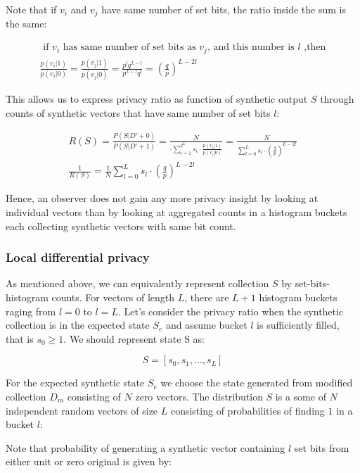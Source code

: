 \documentclass[11pt,draft]{article}
\begin{document}
Note that if $v_i$ and $v_j$ have same number of set bits, the ratio inside the sum is the same:

\begin{align}
\text { if } v_i \text { has same number of set bits as } v_j \text{, and this number is  } l \text{ ,then}  \\
\frac{p(v_i|1)}{p(v_i|0)}  = \frac{p(v_j|1)}{p(v_j|0)} = \frac{p^lq^{L-l}}{p^{L-l}q^l } = \left ( \frac{q}{p} \right )^ {L - 2l}
\end{align}

This allows us to express privacy ratio as function of synthetic output $S$ through counts of synthetic vectors that have same number of set bits $l$:

\begin{align}
R(S) = \frac{P(S|D'+0)}{P(S|D'+1)} =  \frac{N}{ \cdot  \sum_{i=1}^{2^L} s_i  \cdot \frac{p(v_i|1)}{p(v_i|0)} }  = \frac{N}{ \sum_{l=0}^{L} s_l \cdot  \left ( \frac{q}{p} \right )^ {L - 2l} } \\
\frac{1}{R(S)} = \frac{1}{N} \sum_{l=0}^{L} s_l \cdot  \left ( \frac{q}{p} \right )^ {L - 2l} 
\end{align}

Hence, an observer does not gain any more privacy insight by looking at individual vectors than by looking at aggregated counts in a histogram buckets each collecting synthetic vectors with same bit count. 

\subsubsection{Local differential privacy}

As mentioned above, we can equivalently represent collection $S$ by set-bits-histogram counts. For vectors of length $L$, there are $L+1$ histogram buckets raging from $l=0$ to $l=L$. 
Let's consider the privacy ratio when the synthetic collection is in the expected state $S_e$ and assume bucket $l$ is sufficiently filled, that is $s_0 \ge 1$.  We should represent state S as:

\[ S = [s_0, s_1, \dots, s_L] \]

For the expected synthetic state $S_e$ we choose the state generated from modified collection $D_m$ consisting of $N$ zero vectors.  
The distribution $S$ is a some of $N$ independent random vectors of size $L$ consisting of probabilities of finding $1$ in a bucket $l$:

Note that probability of generating a synthetic vector containing $l$ set bits from either unit or zero original is given by:
\end{document}
